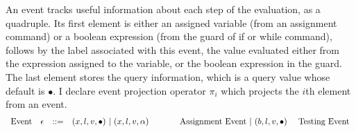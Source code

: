 An event tracks useful information about each step of the evaluation, as a quadruple. Its first element is either 
an assigned variable (from an assignment command) or a boolean expression (from the guard of if or while command), follows by 
 the label associated with this event, the value evaluated either from the expression assigned to the variable,
or the boolean expression in the guard.
 The last element stores the query information, which is a query value whose default is $\bullet$. I declare event projection operator $\pi_i$ which projects the $i$th element from an event.
\[
\begin{array}{llll}
\mbox{Event} 
& \mathtt{\epsilon} & ::= & 
 ({x}, l, v, \bullet) ~|~ ({x}, l, v, \alpha) ~~~~~~~~~~~ \mbox{Assignment Event} 
~|~(b, l, v, \bullet) 
~~~~
\mbox{Testing Event}
\end{array}
\]
% 
